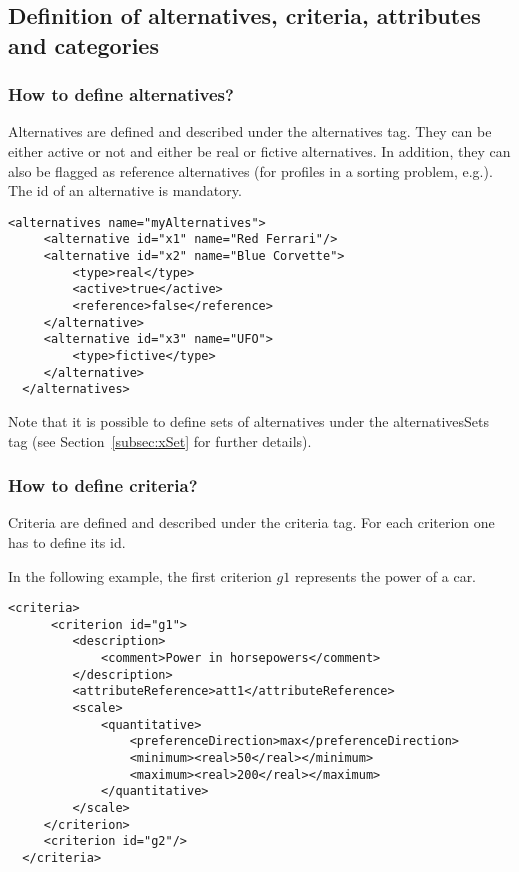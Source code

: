 \documentclass[a4paper,oneside,10 pt]{article}
\newcommand{\code}{\asciifamily}
\begin{document}
\subsection{Definition of alternatives, criteria, attributes and categories}

\subsubsection{How to define alternatives?}

Alternatives are defined and described under the {\code alternatives} tag. They can be either {\code active} or not and either be {\code real} or {\code fictive} alternatives. In addition, they can also be flagged as {\code reference} alternatives (for profiles in a sorting problem, e.g.). The {\code id} of an alternative is mandatory.  

{\code
\begin{lstlisting}[style=prototype]
 <alternatives name="myAlternatives">
	 <alternative id="x1" name="Red Ferrari"/>
	 <alternative id="x2" name="Blue Corvette">
		 <type>real</type>
		 <active>true</active>
		 <reference>false</reference>
	 </alternative>
	 <alternative id="x3" name="UFO">
		 <type>fictive</type>
	 </alternative>
  </alternatives>
\end{lstlisting}
}

Note that it is possible to define sets of alternatives under the {\code alternativesSets} tag (see Section~\ref{subsec:xSet} for further details).

\subsubsection{How to define criteria?}

Criteria are defined and described under the {\code criteria} tag. For each criterion one has to define its {\code id}. 

In the following example, the first criterion $g1$ represents the power of a car. 

{\code
\begin{lstlisting}[style=prototype]
 <criteria>
	  <criterion id="g1">
		 <description>
			 <comment>Power in horsepowers</comment>
		 </description>
		 <attributeReference>att1</attributeReference>
		 <scale>
			 <quantitative>
				 <preferenceDirection>max</preferenceDirection>
				 <minimum><real>50</real></minimum>
				 <maximum><real>200</real></maximum>
			 </quantitative>
		 </scale>
	 </criterion>
	 <criterion id="g2"/>
  </criteria>
\end{lstlisting}
}
\end{document}
